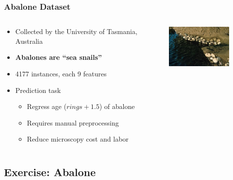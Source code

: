 \documentclass[aspectratio=169]{beamer}
\newcommand\imageright[1]{ %
    \caption*{\scalebox{.5}{\textcolor{lightgray}{\textcopyright~#1}}} %
}
\begin{document}
\begin{frame}
\frametitle{Abalone Dataset}

\begin{columns}
    \begin{column}{0.48\textwidth}
        \begin{itemize}
            \item Collected by the University of Tasmania, Australia
            \item \textbf{Abalones are ``sea snails''}
            \item 4177 instances, each 9 features
            \item Prediction task
            \begin{itemize}
                \item Regress age ($rings + 1.5$) of abalone
                \item Requires manual preprocessing
                \item Reduce microscopy cost and labor
            \end{itemize}
        \end{itemize}
    \end{column}
    \begin{column}{0.48\textwidth}
        \begin{figure}
            \centering
            \includegraphics[width=0.8\linewidth]{abalone2.jpg}
            \imageright{UCI Machine Learning Repository}
        \end{figure}
    \end{column}
\end{columns}
\end{frame}

\subsection{Exercise: Abalone}
\label{subsec:regression-exercise}
\end{document}
